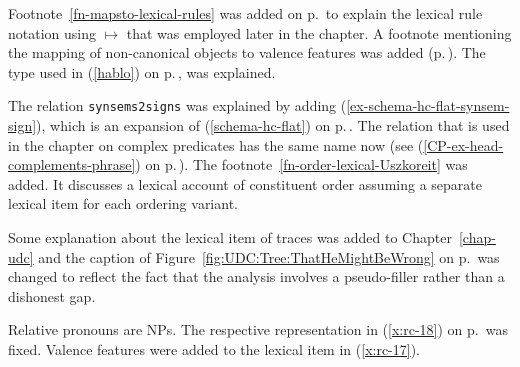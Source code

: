 %


Footnote~\ref{fn-mapsto-lexical-rules} was added on p.\,\pageref{fn-mapsto-lexical-rules} to explain
the lexical rule notation using $\mapsto$ that was employed later in the chapter. A footnote
mentioning the mapping of non-canonical objects to valence features was added (p.\,\pageref{fn-non-cannonical-arg-st}). 
The type  used in (\ref{hablo}) on p.\,\pageref{hablo}, was explained.

The relation \texttt{synsems2signs} was explained by adding (\ref{ex-schema-hc-flat-synsem-sign}),
which is an expansion of (\ref{schema-hc-flat}) on p.\,\pageref{schema-hc-flat}. The relation that
is used in the chapter on complex predicates has the same name now (see
(\ref{CP-ex-head-complements-phrase}) on p.\,\pageref{CP-ex-head-complements-phrase}). The
footnote~\ref{fn-order-lexical-Uszkoreit} was added. It discusses a lexical account of constituent
order assuming a separate lexical item for each ordering variant.







Some explanation about the lexical item of traces was added to Chapter~\ref{chap-udc} and the
caption of Figure~\ref{fig:UDC:Tree:ThatHeMightBeWrong} on
p.\,\pageref{fig:UDC:Tree:ThatHeMightBeWrong} was changed to reflect the fact that the analysis
involves a pseudo-filler rather than a dishonest gap.




Relative pronouns are NPs. The respective representation in (\ref{x:rc-18}) on p.\,\pageref{x:rc-18}
was fixed. Valence features were added to the lexical item in (\ref{x:rc-17}).


